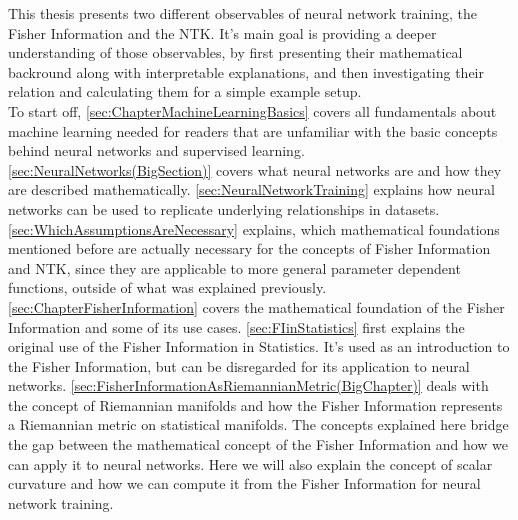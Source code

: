 This thesis presents two different observables of neural network training, the Fisher Information and the NTK. It's main goal is providing a deeper understanding of those observables, by first presenting their mathematical backround along with interpretable explanations, and then investigating their relation and calculating them for a simple example setup.\\
To start off, \cref{sec:ChapterMachineLearningBasics} covers all fundamentals about machine learning needed for readers that are unfamiliar with the basic concepts behind neural networks and supervised learning. \cref{sec:NeuralNetworks(BigSection)} covers what neural networks are and how they are described mathematically. \cref{sec:NeuralNetworkTraining} explains how neural networks can be used to replicate underlying relationships in datasets. \cref{sec:WhichAssumptionsAreNecessary} explains, which mathematical foundations mentioned before are actually necessary for the concepts of Fisher Information and NTK, since they are applicable to more general parameter dependent functions, outside of what was explained previously.\\
\cref{sec:ChapterFisherInformation} covers the mathematical foundation of the Fisher Information and some of its use cases. \cref{sec:FIinStatistics} first explains the original use of the Fisher Information in Statistics. It's used as an introduction to the Fisher Information, but can be disregarded for its application to neural networks. \cref{sec:FisherInformationAsRiemannianMetric(BigChapter)} deals with the concept of Riemannian manifolds and how the Fisher Information represents a Riemannian metric on statistical manifolds. The concepts explained here bridge the gap between the mathematical concept of the Fisher Information and how we can apply it to neural networks. Here we will also explain the concept of scalar curvature and how we can compute it from the Fisher Information for neural network training. %
